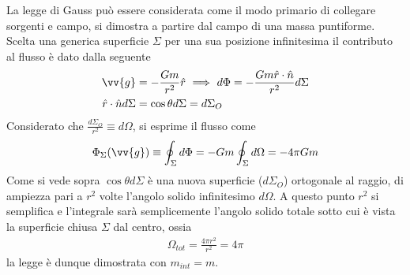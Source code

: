 \documentclass[a4paper, oneside]{book}
\begin{document}
\begin{figure}
\end{figure}
La legge di Gauss può essere considerata come il modo primario di 
collegare sorgenti e campo, si dimostra a partire dal campo di una massa puntiforme.
Scelta una generica superficie $\Sigma$ per una sua posizione infinitesima il contributo al 
flusso è dato dalla seguente
\begin{align*}
    \vv{g} &= -\frac{Gm}{r^{2}}\hat{r} \ \Longrightarrow \ d\Phi = - \frac{Gm\hat{r} \cdot \hat{n}  }{r^{2}}d\Sigma  \\
    \hat{r} \cdot \hat{n} d\Sigma &= \cos\theta d\Sigma = d\Sigma_O   
\end{align*}
Considerato che $\frac{d\Sigma_O}{r^{2}} \equiv d\Omega$, si esprime il flusso come 
\begin{gather*}
    \Phi_\Sigma(\vv{g} ) \equiv \oint_{\Sigma} d\Phi = -Gm \oint_{\Sigma} d\Omega = -4\pi Gm
\end{gather*}
Come si vede sopra $\cos\theta d\Sigma$ è una nuova superficie ($d\Sigma_O$) ortogonale 
al raggio, di ampiezza pari a $r^{2}$ volte l'angolo solido infinitesimo $d\Omega$. A questo 
punto $r^{2}$ si semplifica e l'integrale sarà semplicemente l'angolo solido 
totale sotto cui è vista la superficie chiusa $\Sigma$ dal centro, ossia
\begin{gather*}
    \Omega_{tot} = \frac{4\pi r^{2}}{r^{2}} = 4\pi
\end{gather*}
la legge è dunque dimostrata con $m_{int} = m$.
\end{document}
